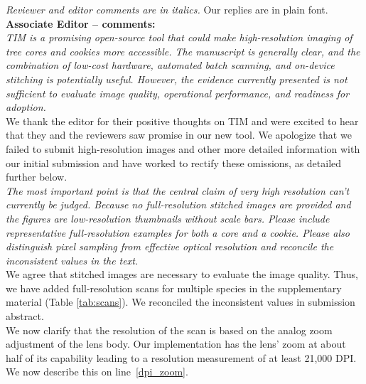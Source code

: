 \documentclass[12pt,a4paper]{article}
\newcommand{\lr}[1]{line~\ref{#1}}
\begin{document}
%



\emph{Reviewer and editor comments are in italics.} Our replies are in plain font.\\ 

{\bf Associate Editor -- comments:} \\

\emph{TIM is a promising open-source tool that could make high-resolution imaging of tree cores and cookies more
accessible. The manuscript is generally clear, and the combination of low-cost hardware, automated batch
scanning, and on-device stitching is potentially useful. However, the evidence currently presented is not
sufficient to evaluate image quality, operational performance, and readiness for adoption.}\\

We thank the editor for their positive thoughts on TIM and were excited to hear that they and the reviewers saw promise in our new tool. We apologize that we failed to submit high-resolution images and other more detailed information with our initial submission and have worked to rectify these omissions, as detailed further below.\\

\emph{The most important point is that the central claim of very high resolution can't currently be judged. Because no full-resolution stitched images are provided and the figures are low-resolution thumbnails without scale bars. Please include representative full-resolution examples for both a core and a cookie. Please also distinguish pixel sampling from effective optical resolution and reconcile the inconsistent values in the text.} \\

We agree that stitched images are necessary to evaluate the image quality. Thus, we have added full-resolution scans for multiple species in the supplementary material  (Table \ref{tab:scans}). We reconciled the inconsistent values in submission abstract. \\

We now clarify that the resolution of the scan is based on the analog zoom adjustment of the lens body. Our implementation has the lens' zoom at about half of its capability leading to a resolution measurement of at least 21,000 DPI. We now describe this on \lr{dpi_zoom}. \\ %
\end{document}
